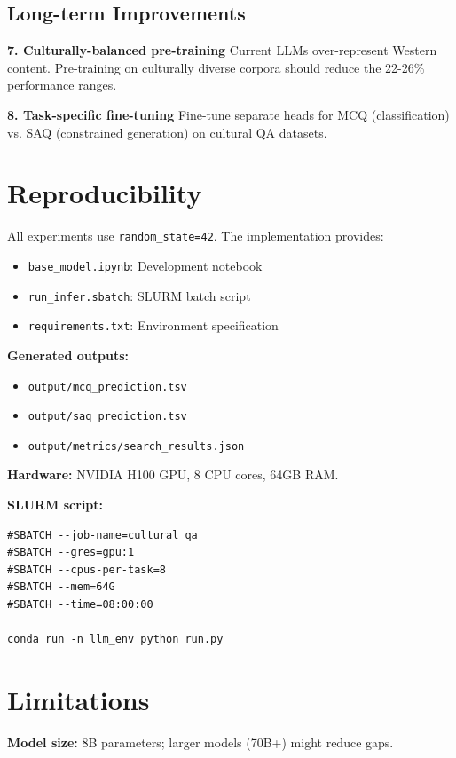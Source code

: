 \documentclass[11pt,a4paper,twocolumn]{article}
\begin{document}
\subsection{Long-term Improvements}

\textbf{7. Culturally-balanced pre-training}
Current LLMs over-represent Western content. Pre-training on culturally diverse corpora should reduce the 22-26\% performance ranges.

\textbf{8. Task-specific fine-tuning}
Fine-tune separate heads for MCQ (classification) vs. SAQ (constrained generation) on cultural QA datasets.

\section{Reproducibility}

All experiments use \texttt{random\_state=42}. The implementation provides:

\begin{itemize}
\item \texttt{base\_model.ipynb}: Development notebook
\item \texttt{run\_infer.sbatch}: SLURM batch script
\item \texttt{requirements.txt}: Environment specification
\end{itemize}

\textbf{Generated outputs:}
\begin{itemize}
\item \texttt{output/mcq\_prediction.tsv}
\item \texttt{output/saq\_prediction.tsv}
\item \texttt{output/metrics/search\_results.json}
\end{itemize}

\textbf{Hardware:} NVIDIA H100 GPU, 8 CPU cores, 64GB RAM.

\textbf{SLURM script:}
\begin{verbatim}
#SBATCH --job-name=cultural_qa
#SBATCH --gres=gpu:1
#SBATCH --cpus-per-task=8
#SBATCH --mem=64G
#SBATCH --time=08:00:00

conda run -n llm_env python run.py
\end{verbatim}

\section{Limitations}

\textbf{Model size:} 8B parameters; larger models (70B+) might reduce gaps.
\end{document}
